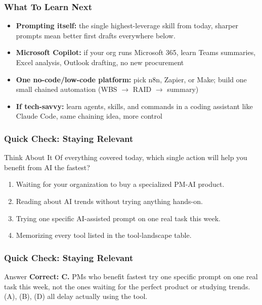 \begin{frame}[fragile]\frametitle{What To Learn Next}

\begin{itemize}
  \item \textbf{Prompting itself:} the single highest-leverage skill from today, sharper prompts mean better first drafts everywhere below.
  \item \textbf{Microsoft Copilot:} if your org runs Microsoft 365, learn Teams summaries, Excel analysis, Outlook drafting, no new procurement
  \item \textbf{One no-code/low-code platform:} pick n8n, Zapier, or Make; build one small chained automation (WBS $\rightarrow$ RAID $\rightarrow$ summary)
  \item \textbf{If tech-savvy:} learn agents, skills, and commands in a coding assistant like Claude Code, same chaining idea, more control
\end{itemize}

\end{frame}

\begin{frame}[fragile]\frametitle{Quick Check: Staying Relevant}
\begin{block}{Think About It}
Of everything covered today, which single action will help you benefit from AI the fastest?
\begin{enumerate}
  \item[A.] Waiting for your organization to buy a specialized PM-AI product.
  \item[B.] Reading about AI trends without trying anything hands-on.
  \item[C.] Trying one specific AI-assisted prompt on one real task this week.
  \item[D.] Memorizing every tool listed in the tool-landscape table.
\end{enumerate}
\end{block}
\end{frame}

\begin{frame}[fragile]\frametitle{Quick Check: Staying Relevant}
\begin{block}{Answer}
\textbf{Correct: C.} PMs who benefit fastest try one specific prompt on one real task this week, not the ones waiting for the perfect product or studying trends. (A), (B), (D) all delay actually using the tool.
\end{block}
\end{frame}


